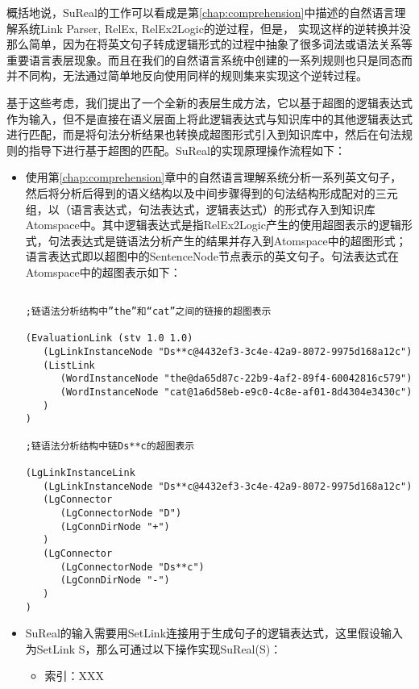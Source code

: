 概括地说，SuReal的工作可以看成是第\ref{chap:comprehension}中描述的自然语言理解系统Link Parser, RelEx, RelEx2Logic的逆过程，但是， 实现这样的逆转换并没那么简单，因为在将英文句子转成逻辑形式的过程中抽象了很多词法或语法关系等重要语言表层现象。而且在我们的自然语言系统中创建的一系列规则也只是同态而并不同构，无法通过简单地反向使用同样的规则集来实现这个逆转过程。

基于这些考虑，我们提出了一个全新的表层生成方法，它以基于超图的逻辑表达式作为输入，但不是直接在语义层面上将此逻辑表达式与知识库中的其他逻辑表达式进行匹配，而是将句法分析结果也转换成超图形式引入到知识库中，然后在句法规则的指导下进行基于超图的匹配。SuReal的实现原理操作流程如下：

\begin{itemize}
\item	使用第\ref{chap:comprehension}章中的自然语言理解系统分析一系列英文句子，然后将分析后得到的语义结构以及中间步骤得到的句法结构形成配对的三元组，以（语言表达式，句法表达式，逻辑表达式）的形式存入到知识库Atomspace中。其中逻辑表达式是指RelEx2Logic产生的使用超图表示的逻辑形式，句法表达式是链语法分析产生的结果并存入到Atomspace中的超图形式；语言表达式即以超图中的SentenceNode节点表示的英文句子。句法表达式在Atomspace中的超图表示如下：

\begin{verbatim}

;链语法分析结构中”the”和“cat”之间的链接的超图表示

(EvaluationLink (stv 1.0 1.0)
   (LgLinkInstanceNode "Ds**c@4432ef3-3c4e-42a9-8072-9975d168a12c")
   (ListLink
      (WordInstanceNode "the@da65d87c-22b9-4af2-89f4-60042816c579")
      (WordInstanceNode "cat@1a6d58eb-e9c0-4c8e-af01-8d4304e3430c")
   )
)

;链语法分析结构中链Ds**c的超图表示

(LgLinkInstanceLink
   (LgLinkInstanceNode "Ds**c@4432ef3-3c4e-42a9-8072-9975d168a12c")
   (LgConnector
      (LgConnectorNode "D")
      (LgConnDirNode "+")
   )
   (LgConnector
      (LgConnectorNode "Ds**c")
      (LgConnDirNode "-")
   )
)

\end{verbatim}

\item	SuReal的输入需要用SetLink连接用于生成句子的逻辑表达式，这里假设输入为SetLink S，那么可通过以下操作实现SuReal(S)：

\begin{itemize}

\item 索引：XXX


\end{itemize}
\end{itemize}

